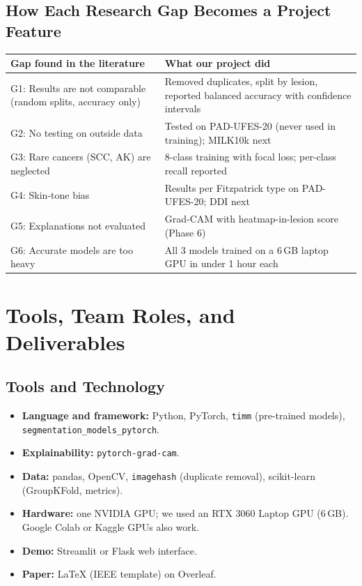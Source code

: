\documentclass[10pt,a4paper]{article}
\begin{document}
\subsection{How Each Research Gap Becomes a Project Feature}
{\small
\renewcommand{\arraystretch}{1.25}
\begin{tabularx}{\linewidth}{@{}L{4.6cm} Y@{}}
\toprule
\textbf{Gap found in the literature} & \textbf{What our project did} \\
\midrule
G1: Results are not comparable (random splits, accuracy only) & Removed duplicates, split by lesion, reported balanced accuracy with confidence intervals \\
G2: No testing on outside data & Tested on PAD-UFES-20 (never used in training); MILK10k next \\
G3: Rare cancers (SCC, AK) are neglected & 8-class training with focal loss; per-class recall reported \\
G4: Skin-tone bias & Results per Fitzpatrick type on PAD-UFES-20; DDI next \\
G5: Explanations not evaluated & Grad-CAM with heatmap-in-lesion score (Phase 6) \\
G6: Accurate models are too heavy & All 3 models trained on a 6\,GB laptop GPU in under 1 hour each \\
\bottomrule
\end{tabularx}
}

\section{Tools, Team Roles, and Deliverables}
\subsection{Tools and Technology}
\begin{itemize}
  \item \textbf{Language and framework:} Python, PyTorch, \texttt{timm}
        (pre-trained models), \texttt{segmentation\_models\_pytorch}.
  \item \textbf{Explainability:} \texttt{pytorch-grad-cam}.
  \item \textbf{Data:} pandas, OpenCV, \texttt{imagehash} (duplicate
        removal), scikit-learn (GroupKFold, metrics).
  \item \textbf{Hardware:} one NVIDIA GPU; we used an RTX 3060 Laptop
        GPU (6\,GB). Google Colab or Kaggle GPUs also work.
  \item \textbf{Demo:} Streamlit or Flask web interface.
  \item \textbf{Paper:} LaTeX (IEEE template) on Overleaf.
\end{itemize}
\end{document}

